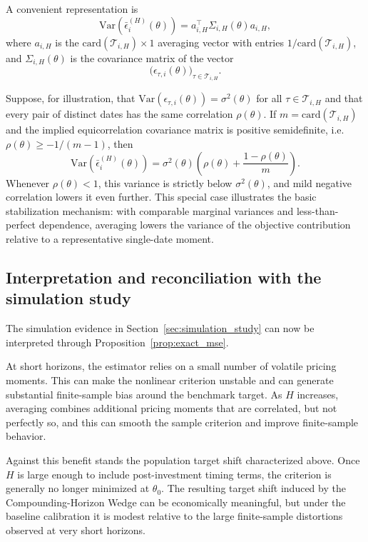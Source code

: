 A convenient representation is
\begin{equation}
	\label{eq:var_matrix}
	\mathrm{Var}\!\left(
	\bar{\epsilon}_i^{(H)}(\theta)
	\right)
	=
	a_{i,H}^\top
	\Sigma_{i,H}(\theta)
	a_{i,H},
\end{equation}
where $a_{i,H}$ is the $\mathrm{card}(\mathcal{T}_{i,H})\times 1$ averaging vector with entries $1/\mathrm{card}(\mathcal{T}_{i,H})$, and $\Sigma_{i,H}(\theta)$ is the covariance matrix of the vector
\[
\bigl(
\epsilon_{\tau,i}(\theta)
\bigr)_{\tau\in\mathcal{T}_{i,H}}.
\]

\begin{remark}
	Suppose, for illustration, that
	$\mathrm{Var}(\epsilon_{\tau,i}(\theta))=\sigma^2(\theta)$
	for all $\tau\in\mathcal{T}_{i,H}$ and that every pair of distinct dates has the same correlation $\rho(\theta)$.
	If $m=\mathrm{card}(\mathcal{T}_{i,H})$ and the implied equicorrelation covariance matrix is positive semidefinite, i.e.\ $\rho(\theta)\ge -1/(m-1)$, then
	\[
	\mathrm{Var}\!\left(
	\bar{\epsilon}_i^{(H)}(\theta)
	\right)
	=
	\sigma^2(\theta)\left(
	\rho(\theta)+\frac{1-\rho(\theta)}{m}
	\right).
	\]
	Whenever $\rho(\theta)<1$, this variance is strictly below $\sigma^2(\theta)$, and mild negative correlation lowers it even further.
	This special case illustrates the basic stabilization mechanism:
	with comparable marginal variances and less-than-perfect dependence, averaging lowers the variance of the objective contribution relative to a representative single-date moment.
\end{remark}

\subsection{Interpretation and reconciliation with the simulation study}
\label{sec:appendix_bv_interpretation}

The simulation evidence in Section~\ref{sec:simulation_study} can now be interpreted through Proposition~\ref{prop:exact_mse}.

At short horizons, the estimator relies on a small number of volatile pricing moments.
This can make the nonlinear criterion unstable and can generate substantial finite-sample bias around the benchmark target.
As $H$ increases, averaging combines additional pricing moments that are correlated, but not perfectly so, and this can smooth the sample criterion and improve finite-sample behavior.

Against this benefit stands the population target shift characterized above.
Once $H$ is large enough to include post-investment timing terms, the criterion is generally no longer minimized at $\theta_0$.
The resulting target shift induced by the Compounding-Horizon Wedge can be economically meaningful, but under the baseline calibration it is modest relative to the large finite-sample distortions observed at very short horizons.


